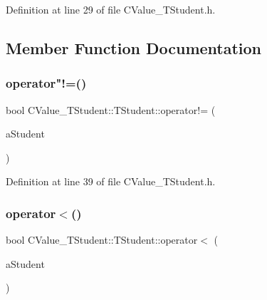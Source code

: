 Definition at line 29 of file C\+Value\+\_\+\+T\+Student.\+h.



\subsection{Member Function Documentation}
\mbox{\label{struct_c_value___t_student_1_1_t_student_aaadc7d5525e434de77c6874052174903}} 
\subsubsection{\texorpdfstring{operator"!=()}{operator!=()}}
{\footnotesize\ttfamily bool C\+Value\+\_\+\+T\+Student\+::\+T\+Student\+::operator!= (\begin{DoxyParamCaption}\item[{const \hyperlink{struct_c_value___t_student_1_1_t_student}{T\+Student} \&}]{a\+Student }\end{DoxyParamCaption})\hspace{0.3cm}{\ttfamily [inline]}}



Definition at line 39 of file C\+Value\+\_\+\+T\+Student.\+h.

\mbox{\label{struct_c_value___t_student_1_1_t_student_a0e70d174799ef62209bfd2719077f127}} 
\subsubsection{\texorpdfstring{operator$<$()}{operator<()}}
{\footnotesize\ttfamily bool C\+Value\+\_\+\+T\+Student\+::\+T\+Student\+::operator$<$ (\begin{DoxyParamCaption}\item[{const \hyperlink{struct_c_value___t_student_1_1_t_student}{T\+Student} \&}]{a\+Student }\end{DoxyParamCaption})\hspace{0.3cm}{\ttfamily [inline]}}



